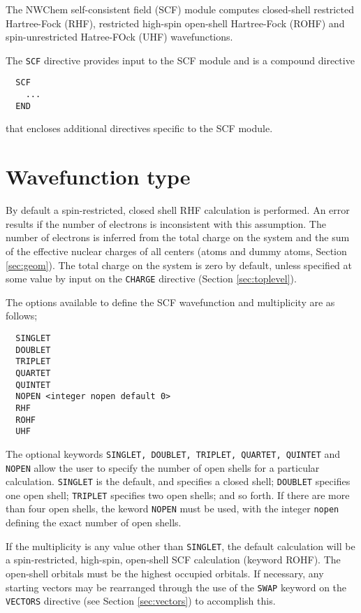 \label{sec:scf}

The NWChem self-consistent field (SCF) module computes closed-shell
restricted Hartree-Fock (RHF), restricted high-spin open-shell
Hartree-Fock (ROHF) and spin-unrestricted Hatree-FOck (UHF)
wavefunctions. 

The \verb+SCF+ directive provides input to the SCF module
and is a compound directive
\begin{verbatim}
  SCF
    ...
  END
\end{verbatim}
that encloses additional directives specific to the SCF module. 

\section{Wavefunction type}

By default a spin-restricted, closed shell RHF calculation is
performed.  An error results if the number of electrons is
inconsistent with this assumption.  The number of electrons is
inferred from the total charge on the system and the sum of the
effective nuclear charges of all centers (atoms and dummy atoms,
Section \ref{sec:geom}).  The total charge on the system is zero by
default, unless specified at some value by input on the \verb+CHARGE+
directive (Section \ref{sec:toplevel}).

The options available to define the SCF wavefunction and multiplicity
are as follows;

\begin{verbatim}
  SINGLET 
  DOUBLET 
  TRIPLET 
  QUARTET 
  QUINTET 
  NOPEN <integer nopen default 0>
  RHF
  ROHF
  UHF
\end{verbatim}

The optional keywords \verb+SINGLET, DOUBLET, TRIPLET, QUARTET, QUINTET+ 
and \verb+NOPEN+ allow the user to specify the number of open shells for a 
particular calculation.  \verb+SINGLET+ is the default, and specifies a 
closed shell; \verb+DOUBLET+ specifies one open shell; \verb+TRIPLET+
specifies two open shells; and so forth.  If there are more than four
open shells, the keword \verb+NOPEN+ must be used, with the integer
\verb+nopen+ defining the exact number of open shells.

If the multiplicity is any value other than \verb+SINGLET+, the
default calculation will be a spin-restricted, high-spin, open-shell
SCF calculation (keyword ROHF).  The open-shell orbitals must be the
highest occupied orbitals.  If necessary, any starting vectors may be
rearranged through the use of the \verb+SWAP+ keyword on the
\verb+VECTORS+ directive (see Section \ref{sec:vectors}) to accomplish
this.

